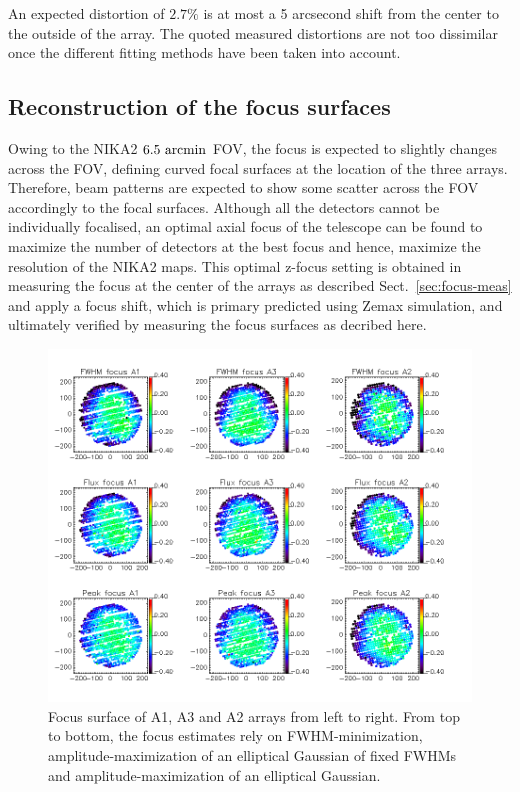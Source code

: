 An expected distortion of $2.7\%$ is at most a 5 arcsecond shift from the
center to the outside of the array.  The quoted measured distortions are not
too dissimilar once the different fitting methods have been taken into
account.



\subsection{Reconstruction of the focus surfaces}
\label{sec:focus}

Owing to the NIKA2 $6.5~\rm{arcmin}$ FOV, the focus is expected to
slightly changes across the FOV, defining curved focal surfaces at the
location of the three arrays. Therefore, beam patterns are expected to
show some scatter across the FOV accordingly to the focal
surfaces. Although all the detectors cannot be individually focalised,
an optimal axial focus of the telescope can be found to maximize the
number of detectors at the best focus and hence, maximize the
resolution of the NIKA2 maps.
This optimal z-focus setting is obtained
in measuring the focus at the center of the arrays as described
Sect.~\ref{sec:focus-meas} and apply a focus shift, which is primary
predicted using Zemax simulation, and ultimately verified by measuring
the focus surfaces as decribed here.

\begin{figure}
\begin{center}
  \includegraphics[trim={0, 1cm, 0, 1cm}, clip, angle=0, scale=0.5]{Figures/fov_focus_mv_5.png}
\caption{Focus surface of A1, A3 and A2 arrays from left to
  right. From top to bottom, the focus estimates rely on
  FWHM-minimization, amplitude-maximization of an elliptical
  Gaussian of fixed FWHMs and amplitude-maximization of an elliptical
  Gaussian.}
\label{fig:focus-surfaces}
\end{center}
\end{figure}


